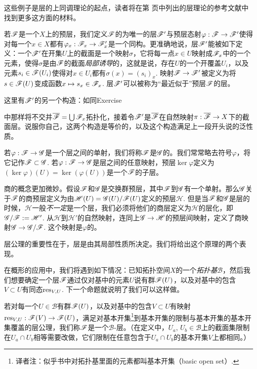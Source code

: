 这些例子是层的上同调理论的起点，读者将在第 \pageref{ref:1} 页中列出的层理论的参考文献中找到更多这方面的材料。

若$\mathscr{F}$是一个$X$上的预层，我们定义$\mathscr{F}$的为唯一的层$\mathscr{F}'$与预层态射$\varphi:\mathscr{F}\to\mathscr{F}'$使得对每一个$x\in X$都有$\varphi_x:\mathscr{F}_x\to\mathscr{F}'_x$是一个同构。更准确地说，层$\mathscr{F}'$能被如下定义：一个$\mathscr{F}'$在开集$U$上的截面是一个映射$\sigma$，它将每一点$x\in U$映射成$\mathscr{F}_x$中的一个元素，使得$\sigma$是由$\mathscr{F}$的截面\textit{局部诱导}的，这就是说，存在$U$的一个开覆盖$U_i$，以及元素$s_i\in \mathscr{F}(U_i)$使得对$x\in U_i$都有$\sigma(x)=(s_i)_x$. 映射$\mathscr{F}\to\mathscr{F}'$被定义为将$s\in\mathscr{F}(U)$变成函数$x\mapsto s_x\in\mathscr{F}_x$. 层$\mathscr{F}'$可以被称为“最近似于”预层$\mathscr{F}$的层。

\begin{exe}
	这里有$\mathscr{F}'$的另一个构造：如同Exercise {{\addtocounter{thm}{-3}}\thethm{\addtocounter{thm}{3}}}中那样将不交并$\overline{\mathscr{F}}=\bigcup \mathscr{F}_x$拓扑化，接着令$\mathscr{F}'$是$\overline{\mathscr{F}}$在自然映射$\pi:\overline{\mathscr{F}}\to X$下的截面层。说服你自己，这两个构造是等价的，以及这个构造满足上一段开头说的泛性质。
\end{exe}

若$\varphi:\mathscr{F}\to\mathscr{G}$是一个层之间的单射，我们将称$\mathscr{F}$是$\mathscr{G}$的。我们常常略去符号$\varphi$，将它记作$\mathscr{F}\subset \mathscr{G}$. 若$\varphi:\mathscr{F}\to\mathscr{G}$是层之间的任意映射，预层$\ker\varphi$定义为$(\ker\varphi)(U)=\ker(\varphi(U))$是一个$\mathscr{F}$的子层。

商的概念更加微妙。假设$\mathscr{F}$和$\mathscr{G}$是交换群预层，其中$\mathscr{F}$到$\mathscr{G}$有一个单射。那么$\mathscr{G}$关于$\mathscr{F}$的商预层定义为由$\mathscr{H}(U)=\mathscr{G}(U)/\mathscr{F}(U)$定义的预层$\mathscr{H}$. 但是当$\mathscr{F}$和$\mathscr{G}$是层的时候，$\mathscr{H}$一般\textit{不一定}是一个层，我们必须将他们的商层定义为$\mathscr{H}$的层化，即$\mathscr{G}/\mathscr{F}:=\mathscr{H}'$. 从$\mathscr{H}$到$\mathscr{H}'$的自然映射，连同上$\mathscr{G}\to \mathscr{H}$的预层间映射，定义了商映射$\mathscr{G}\to \mathscr{G}/\mathscr{F}$. 这个映射是$\varphi$的。

层公理的重要性在于，层是由其局部性质所决定。我们将给出这个原理的两个表现。

在概形的应用中，我们将遇到如下情况：已知拓扑空间$X$的一个\textit{拓扑基}$\mathscr{B}$，然后我们想要确定一个层$\mathscr{F}$通过仅对基中的元素$U$说有群$\mathscr{F}(U)$，以及对基中的包含$V\subset U$有同态$\operatorname{res}_{V,U}$. 下一个命题就说明了我们可以这样做。

若对每一个$U\in\mathscr{B}$有群$\mathscr{F}(U)$，以及对基中的包含$V\subset U$有映射$\operatorname{res}_{V,U}:\mathscr{F}(V)\to \mathscr{F}(U)$，满足对基本开集\footnote{译者注：似乎书中对拓扑基里面的元素都叫基本开集（basic open set）.}到基本开集的限制与基本开集的基本开集覆盖的层公理，我们称$\mathscr{F}$是一个$\mathscr{B}$\hyp 层。（在定义中，$U_a$, $U_b\in\mathscr{B}$上的截面集限制在$U_a\cap U_b$相等需要改做，它们限制在任意包含于$U_a\cap U_b$的基本开集$V$上都相同。）

